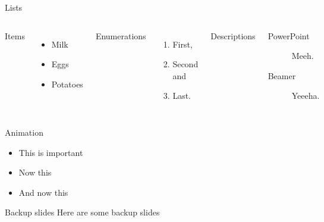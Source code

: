 \begin{frame}{Lists}
  \begin{columns}[T,onlytextwidth]
    Items
    \begin{itemize}
      \item Milk \item Eggs \item Potatoes
    \end{itemize}

    Enumerations
    \begin{enumerate}
      \item First, \item Second and \item Last.
    \end{enumerate}

    Descriptions
    \begin{description}
      \item[PowerPoint] Meeh. \item[Beamer] Yeeeha.
    \end{description}
  \end{columns}
\end{frame}

\begin{frame}{Animation}
  \begin{itemize}[<+- | alert@+>]
    \item \alert<4>{This is important}
    \item Now this
    \item And now this
  \end{itemize}
\end{frame}

\appendix

\begin{frame}{Backup slides}
  Here are some backup slides
\end{frame}





